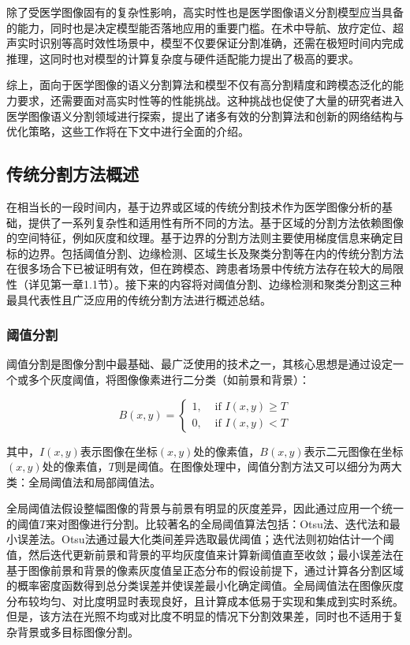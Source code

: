 除了受医学图像固有的复杂性影响，高实时性也是医学图像语义分割模型应当具备的能力，同时也是决定模型能否落地应用的重要门槛。在术中导航、放疗定位、超声实时识别等高时效性场景中，模型不仅要保证分割准确，还需在极短时间内完成推理，这同时也对模型的计算复杂度与硬件适配能力提出了极高的要求。

综上，面向于医学图像的语义分割算法和模型不仅有高分割精度和跨模态泛化的能力要求，还需要面对高实时性等的性能挑战。这种挑战也促使了大量的研究者进入医学图像语义分割领域进行探索，提出了诸多有效的分割算法和创新的网络结构与优化策略，这些工作将在下文中进行全面的介绍。

\subsection{传统分割方法概述}


在相当长的一段时间内，基于边界或区域的传统分割技术作为医学图像分析的基础，提供了一系列复杂性和适用性有所不同的方法。基于区域的分割方法依赖图像的空间特征，例如灰度和纹理。基于边界的分割方法则主要使用梯度信息来确定目标的边界。包括阈值分割、边缘检测、区域生长及聚类分割等在内的传统分割方法在很多场合下已被证明有效\cite{xu2024}，但在跨模态、跨患者场景中传统方法存在较大的局限性（详见第一章1.1节）。接下来的内容将对阈值分割、边缘检测和聚类分割这三种最具代表性且广泛应用的传统分割方法进行概述总结。

\subsubsection{阈值分割}

阈值分割是图像分割中最基础、最广泛使用的技术之一，其核心思想是通过设定一个或多个灰度阈值，将图像像素进行二分类（如前景和背景）：

\begin{equation}
B(x, y)=\left\{\begin{array}{ll}1, & \text { if } I(x, y) \geq T \\ 0, & \text { if } I(x, y)<T\end{array}\right.
\end{equation}

其中，$I(x, y)$表示图像在坐标$(x, y)$处的像素值，$B(x, y)$表示二元图像在坐标$(x, y)$处的像素值，$T$则是阈值。在图像处理中，阈值分割方法又可以细分为两大类：全局阈值法和局部阈值法。

全局阈值法假设整幅图像的背景与前景有明显的灰度差异，因此通过应用一个统一的阈值$T$来对图像进行分割。比较著名的全局阈值算法包括：Otsu法、迭代法和最小误差法。Otsu法通过最大化类间差异选取最优阈值；迭代法则初始估计一个阈值，然后迭代更新前景和背景的平均灰度值来计算新阈值直至收敛；最小误差法在基于图像前景和背景的像素灰度值呈正态分布的假设前提下，通过计算各分割区域的概率密度函数得到总分类误差并使误差最小化确定阈值。全局阈值法在图像灰度分布较均匀、对比度明显时表现良好，且计算成本低易于实现和集成到实时系统。但是，该方法在光照不均或对比度不明显的情况下分割效果差，同时也不适用于复杂背景或多目标图像分割。

